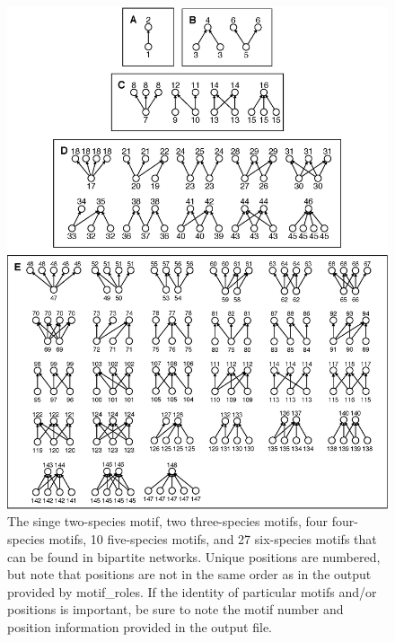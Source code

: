 \documentclass[12pt]{article}
\begin{document}
	\begin{figure}[h!]
		\label{bipartite_motifs}
		\caption{The singe two-species motif, two three-species motifs, four four-species motifs, 10 five-species motifs, and 27 six-species motifs that can be found in bipartite networks. Unique positions are numbered, but note that positions are not in the same order as in the output provided by motif\_roles. If the identity of particular motifs and/or positions is important, be sure to note the motif number and position information provided in the output file.}
		\includegraphics*[width=\textwidth]{bipartite_motifs.eps}
	\end{figure}

\clearpage





\clearpage
\end{document}
